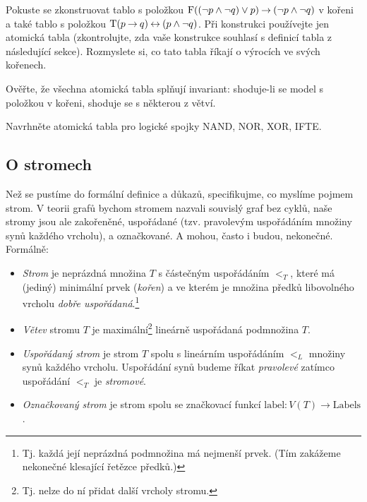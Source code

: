 \begin{exercise}\label{exercise:construct-tableaux}
    Pokuste se zkonstruovat tablo s položkou $\mathrm{F}((\neg p\land\neg q)\lor p)\mathbin{\rightarrow}(\neg p\land\neg q)$ v kořeni a také tablo s položkou $\mathrm{T}(p\mathbin{\rightarrow} q)\mathbin{\leftrightarrow}(p\land\neg q)$. Při konstrukci používejte jen atomická tabla (zkontrolujte, zda vaše konstrukce souhlasí s definicí tabla z následující sekce). Rozmyslete si, co tato tabla říkají o výrocích ve svých kořenech.
\end{exercise}

\begin{exercise}
Ověřte, že všechna atomická tabla splňují invariant: shoduje-li se model s položkou v kořeni, shoduje se s některou z větví.
\end{exercise}

\begin{exercise}
Navrhněte atomická tabla pro logické spojky NAND, NOR, XOR, IFTE.
\end{exercise}

\subsection{O stromech}
Než se pustíme do formální definice a důkazů, specifikujme, co myslíme pojmem strom. V teorii grafů bychom stromem nazvali souvislý graf bez cyklů, naše stromy jsou ale zakořeněné, uspořádané (tzv. pravolevým uspořádáním množiny synů každého vrcholu), a označkované. A mohou, často i budou, nekonečné. Formálně:

\begin{definition}[Strom]
\begin{itemize}
\item \emph{Strom} je neprázdná množina $T$ s částečným uspořádáním $<_T$, které má (jediný) minimální prvek (\emph{kořen}) a ve kterém je množina předků libovolného vrcholu \emph{dobře uspořádaná}.\footnote{Tj. každá její neprázdná podmnožina má nejmenší prvek. (Tím zakážeme nekonečné klesající řetězce předků.)}
\item \emph{Větev} stromu $T$ je maximální\footnote{Tj. nelze do ní přidat další vrcholy stromu.} lineárně uspořádaná podmnožina $T$.
\item \emph{Uspořádaný strom} je strom $T$ spolu s lineárním uspořádáním $<_L$ množiny synů každého vrcholu. Uspořádání synů budeme říkat \emph{pravolevé} zatímco uspořádání $<_T$ je \emph{stromové}.
\item \emph{Označkovaný strom} je strom spolu se značkovací funkcí $\mathrm{label}\colon V(T)\to\mathrm{Labels}$.
\end{itemize}
\end{definition}

